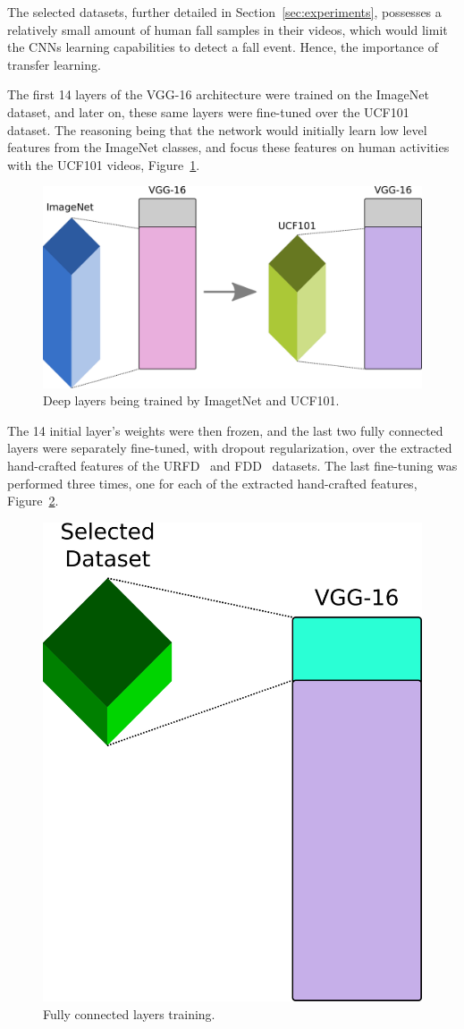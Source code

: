 \documentclass[conference]{IEEEtran}
\begin{document}
{The selected datasets, further detailed in Section~\ref{sec:experiments}, possesses a relatively small amount of human fall samples in their videos, which would limit the CNNs learning capabilities to detect a fall event. Hence, the importance of transfer learning.

The first 14 layers of the VGG-16 architecture were trained on the ImageNet~\cite{imagenet_cvpr09} dataset, and later on, these same layers were fine-tuned over the UCF101~\cite{soomro2012ucf101} dataset. The reasoning being that the network would initially learn low level features from the ImageNet classes, and focus these features on human activities with the UCF101 videos, Figure~\ref{fig:pre14}.

\begin{figure}[htbp]
\centerline{\includegraphics[width=0.9\linewidth]{figures/pre14.png}}
\caption{Deep layers being trained by ImagetNet and UCF101.}
\label{fig:pre14}
\end{figure}

The 14 initial layer's weights were then frozen, and the last two fully connected layers were separately fine-tuned, with dropout regularization, over the extracted hand-crafted features of the URFD~\cite{kepski2014human} and FDD~\cite{charfi2013optimised} datasets. The last fine-tuning was performed three times, one for each of the extracted hand-crafted features, Figure~\ref{fig:pos14}.

\begin{figure}[htbp]
\centerline{\includegraphics[width=0.4\linewidth]{figures/pos14.png}}
\caption{Fully connected layers training.}
\label{fig:pos14}
\end{figure}

}
\end{document}
